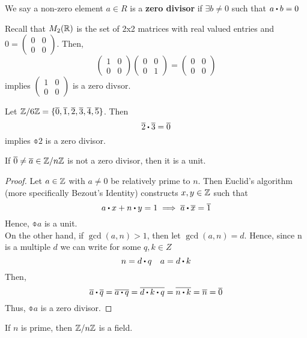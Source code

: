 \documentclass[../Main.tex]{subfiles}
\begin{document}
\begin{dfn}[title=Zero Divisor]
	We say a non-zero element $a\in R$ is a \textbf{zero divisor} if $\exists b \ne 0$ such that $a\rdot b=0$
\end{dfn}
\begin{example}
	Recall that $M_2(\mathbb{R})$ is the set of 2x2 matrices with real valued entries and $0 = \begin{pmatrix}
		0&0\\0&0
	\end{pmatrix}$. Then,
	\[\begin{pmatrix}
	1&0\\0&0
	\end{pmatrix}\begin{pmatrix}
	0&0\\0&1
	\end{pmatrix}=\begin{pmatrix}
	0&0\\0&0
	\end{pmatrix}\]
	implies $\begin{pmatrix}
	1&0\\0&0
	\end{pmatrix}$ is a zero divsor.
\end{example}
\begin{example}
	Let $\mathbb{Z}/6\mathbb{Z} = \{\overline{0},\overline{1},\overline{2},\overline{3},\overline{4},\overline{5} \}$. Then
	\[\obar{2}\rdot \obar{3} = \obar{0} \]
	implies $\obar{2}$ is a zero divisor.
\end{example}
\begin{claim}
	If $\overline{0}\ne\overline{a}\in \mathbb{Z}/n\mathbb{Z}$ is not a zero divisor, then it is a unit.
\end{claim}
\begin{proof}
	Let $a\in\mathbb{Z}$ with $a\ne0$ be relatively prime to $n$. Then Euclid's algorithm (more specifically Bezout's Identity) constructs $x,y\in \mathbb{Z}$ such that\
	\[a\rdot x+n\rdot y=1 \implies \obar{a}\rdot \obar{x}=\obar{1}\]
	Hence, $\obar{a}$ is a unit.\\
	On the other hand, if $\gcd(a,n)>1$, then let $\gcd(a,n)=d$. Hence, since n is a multiple $d$ we can write for some $q,k\in Z$
	\[n=d\rdot q \quad a = d\rdot k\]
	Then,
	\[\obar{a}\rdot \obar{q}=\obar{a\rdot q}= \obar{d\rdot k\rdot q} = \obar{n \rdot k}=\obar{n}=\obar{0}\] 
	Thus, $\obar{a}$ is a zero divisor.
\end{proof}
\begin{crl}[title= \texorpdfstring{$\modZ{n}$}{Z/nZ} is a field for prime \texorpdfstring{$n$}{n}]
	If $n$ is prime, then $\mathbb{Z}/n\mathbb{Z}$ is a field.
\end{crl}
\end{document}
